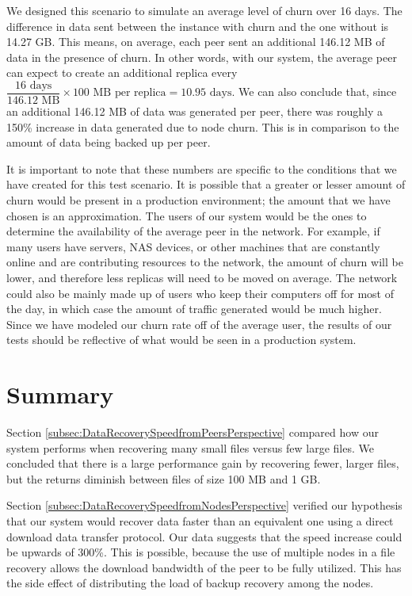 \documentclass[12pt]{report}
\begin{document}
We designed this scenario to simulate an average level of churn over 16 days. The difference in data sent between the instance with churn and the one without is 14.27 GB. This means, on average, each peer sent an additional 146.12 MB of data in the presence of churn. In other words, with our system, the average peer can expect to create an additional replica every $\dfrac{16 \text{ days}}{146.12 \text{ MB}} \times 100 \text{ MB per replica} = 10.95 \text{ days}$. We can also conclude that, since an additional 146.12 MB of data was generated per peer, there was roughly a 150\% increase in data generated due to node churn. This is in comparison to the amount of data being backed up per peer.

It is important to note that these numbers are specific to the conditions that we have created for this test scenario. It is possible that a greater or lesser amount of churn would be present in a production environment; the amount that we have chosen is an approximation. The users of our system would be the ones to determine the availability of the average peer in the network. For example, if many users have servers, NAS devices, or other machines that are constantly online and are contributing resources to the network, the amount of churn will be lower, and therefore less replicas will need to be moved on average. The network could also be mainly made up of users who keep their computers off for most of the day, in which case the amount of traffic generated would be much higher. Since we have modeled our churn rate off of the average user, the results of our tests should be reflective of what would be seen in a production system.

\section{Summary}

Section \ref{subsec:DataRecoverySpeedfromPeersPerspective} compared how our system performs when recovering many small files versus few large files. We concluded that there is a large performance gain by recovering fewer, larger files, but the returns diminish between files of size 100 MB and 1 GB.

Section \ref{subsec:DataRecoverySpeedfromNodesPerspective} verified our hypothesis that our system would recover data faster than an equivalent one using a direct download data transfer protocol. Our data suggests that the speed increase could be upwards of 300\%. This is possible, because the use of multiple nodes in a file recovery allows the download bandwidth of the peer to be fully utilized. This has the side effect of distributing the load of backup recovery among the nodes.
\end{document}
